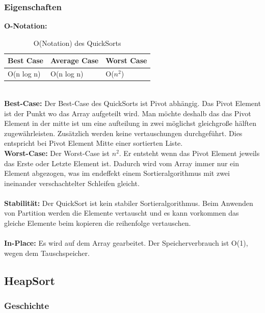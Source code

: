 \documentclass{article}
\begin{document}
\subsubsection*{Eigenschaften}
\textbf{O-Notation:}
\begin{table}[h]
\centering
\begin{tabular}{lll}
	\hline
	\textbf{Best Case} & \textbf{Average Case} & \textbf{Worst Case} \\
	\hline
	O(n log n) & O(n log n) & O($n^{2}$) \\
	\hline
\end{tabular}
\caption{O(Notation) des QuickSorts \cite{India2015Dataset}}
\label{tab:QuickSort}
\end{table}
\\
\textbf{Best-Case:} Der Best-Case des QuickSorts ist Pivot abhängig. Das Pivot Element ist der Punkt wo das Array aufgeteilt wird. Man möchte deshalb das das Pivot Element in der mitte ist um eine aufteilung in zwei möglichst gleichgroße hälften zugewährleisten. Zusätzlich werden keine vertauschungen durchgeführt. Dies entspricht bei Pivot Element Mitte einer sortierten Liste.\\
\textbf{Worst-Case:} Der Worst-Case ist  $n^{2}$. Er entsteht wenn das Pivot Element jeweils das Erste oder Letzte Element ist. Dadurch wird vom Array immer nur ein Element abgezogen, was im endeffekt einem Sortieralgorithmus mit zwei ineinander verschachtelter Schleifen gleicht.\\ \\
\textbf{Stabilität:} Der QuickSort ist kein stabiler Sortieralgorithmus. Beim Anwenden von Partition werden die Elemente vertauscht und es kann vorkommen das gleiche Elemente beim kopieren die reihenfolge vertauschen. \\
\\
\textbf{In-Place:} Es wird auf dem Array gearbeitet. Der Speicherverbrauch ist O(1), wegen dem Tauschspeicher.  \\
\subsection{HeapSort}
\subsubsection*{Geschichte}
\end{document}
